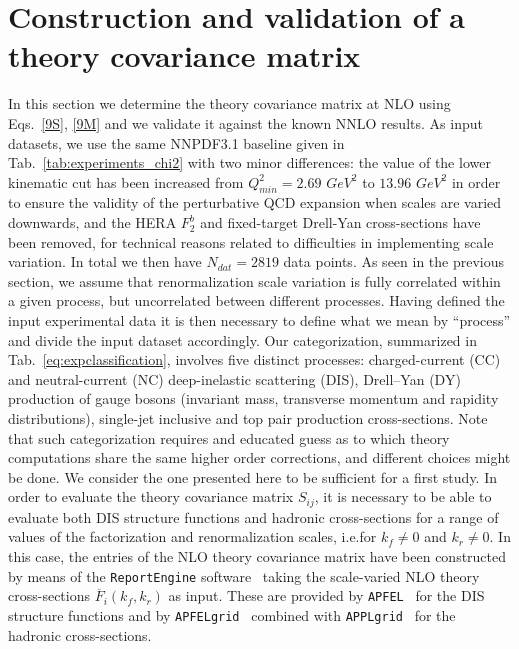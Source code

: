     \section{Construction and validation of a theory covariance matrix}
    \label{sec:validation}
    In this section we determine the theory covariance matrix at NLO using Eqs.~\ref{9S}, \ref{9M}
    and we validate it against the known NNLO results.
    As input datasets, we use the same NNPDF3.1 baseline given in Tab.~\ref{tab:experiments_chi2} with two minor differences:
    the value of the lower kinematic cut has been increased from $Q^2_{min} = 2.69 \,\,GeV^2$ to $13.96 \,\, GeV^2$
    in order to ensure the validity of the perturbative QCD expansion when scales are varied downwards, 
    and the HERA $F^b_2$ and fixed-target Drell-Yan cross-sections have been removed, 
    for technical reasons related to difficulties in implementing scale variation. 
    In total we then have $N_{dat} = 2819$ data points.
    As seen in the previous section, we assume that renormalization scale variation is fully correlated within 
    a given process, but uncorrelated between different processes.
    Having defined the input experimental data it is then necessary to define what we mean by ``process'' and
    divide the input dataset accordingly.
    Our categorization, summarized in Tab.~\ref{eq:expclassification}, involves five distinct processes:  charged-current (CC)
    and neutral-current (NC) deep-inelastic scattering (DIS),
    Drell–Yan (DY) production of gauge bosons (invariant mass,
    transverse momentum and rapidity distributions), single-jet
    inclusive and top pair production cross-sections.
    Note that such categorization requires and educated guess as to which theory computations share the same higher order
    corrections, and different choices might be done. 
    We consider the one presented here to be sufficient for a first study. 
    In order to evaluate the theory covariance matrix $S_{ij}$, it is necessary
    to be able to evaluate both DIS structure functions and hadronic
    cross-sections for a range of values of the factorization
    and renormalization scales, i.e.for $k_f \neq  0$ and $k_r \neq 0$.
    In this case, the entries of the NLO theory covariance matrix have been 
    constructed
    by means of the {\tt ReportEngine} software~\cite{zahari_kassabov_2019_2571601}
    taking the
    scale-varied NLO theory cross-sections $\overline{F}_i(k_f,k_r)$  as input.
    These are provided 
    by {\tt APFEL}~\cite{Bertone:2013vaa} for the DIS structure functions
    and by {\tt APFELgrid}~\cite{Bertone:2016lga} combined with
    {\tt APPLgrid}~\cite{Carli:2010rw} for the hadronic
    cross-sections.

